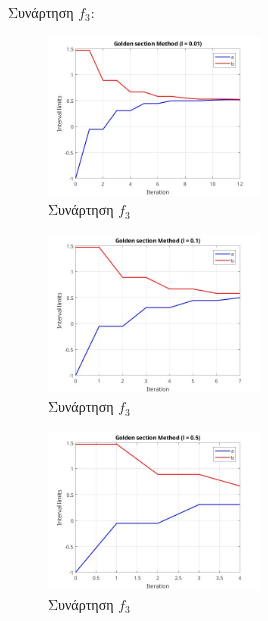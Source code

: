 Συνάρτηση $f_3$:
\begin{figure}[H] %
    \centering
    \includegraphics[width=0.5\textwidth]{media/goldenf3_001} %
    \caption{Συνάρτηση $f_3$}
\end{figure}
\begin{figure}[H] %
    \centering
    \includegraphics[width=0.5\textwidth]{media/goldenf3_01} %
    \caption{Συνάρτηση $f_3$}
\end{figure}
\begin{figure}[H] %
    \centering
    \includegraphics[width=0.5\textwidth]{media/goldenf3_05} %
    \caption{Συνάρτηση $f_3$}
\end{figure}